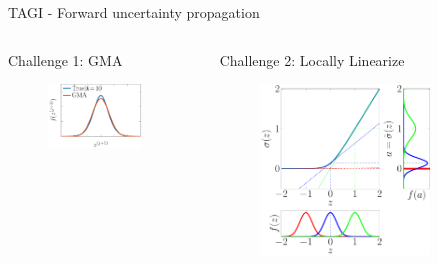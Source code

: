 \documentclass[final]{beamer}
\begin{document}
\begin{frame}[t]
\begin{columns}
\begin{column}[T]{.31\textwidth}
\begin{block}{TAGI - Forward uncertainty propagation}
\begin{columns}
\begin{column}{0.33\textwidth}
{\color{magenta}Challenge 1:} GMA
\vspace{1.1cm}
 \begin{figure}[h!]
 \centering
  \includegraphics[width=0.85\textwidth]{Figures/GMA_CLT_10.pdf}
 \end{figure}
\vspace{1cm}

\end{column}
\begin{column}{0.33\textwidth}
{\color{cyan}Challenge 2:} Locally Linearize
 \begin{figure}[h!]
 \centering
  \includegraphics[width=0.8\textwidth]{Figures/Linearized_activation_fct.pdf}
 \end{figure}
\end{column}
\end{columns}
 \end{block}


\end{column}
\end{columns}
\end{frame}
\end{document}
